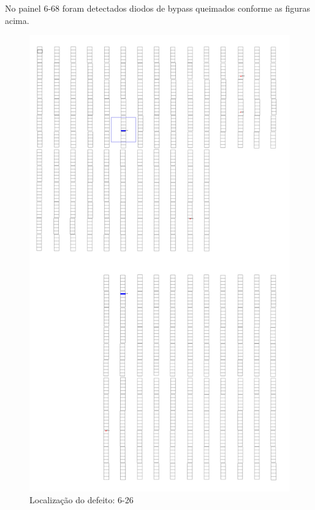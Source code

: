 \documentclass[dvipsnames]{article}%
\begin{document}
%
\FloatBarrier%
No painel 6{-}68 foram detectados diodos de bypass queimados conforme as figuras acima.\newline%
%


\begin{figure}[h!]%
\begin{minipage}{0.31\linewidth}%
\centering%
\centering%
\includegraphics[width=\linewidth]{report_images/faultydiodes_6-26_map.jpg}%
\caption{Localização do defeito: 6-26}%
\end{minipage}%
\hfill%

\end{figure}
\end{document}
